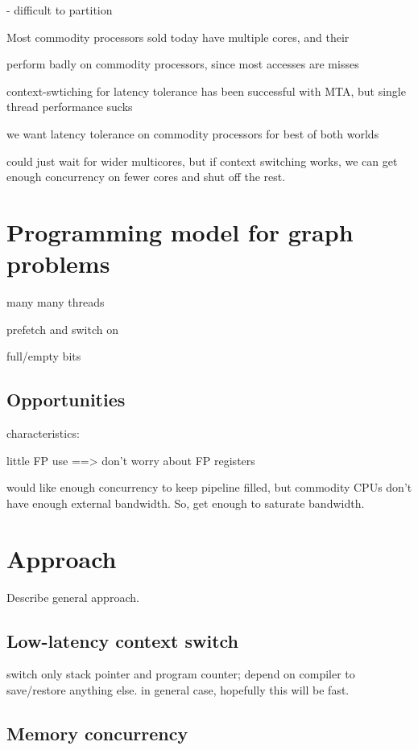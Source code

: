 \documentclass{acm_proc_article-sp}
\begin{document}
- difficult to partition




Most commodity processors sold today have multiple cores, and their 


perform badly on commodity processors, since most accesses are misses

context-swtiching for latency tolerance has been successful with MTA, but single thread performance sucks

we want latency tolerance on commodity processors for best of both worlds

could just wait for wider multicores, but if context switching works, we can get enough concurrency on fewer cores and shut off the rest.

\section{Programming model for graph problems}

many many threads

prefetch and switch on 

full/empty bits 

\subsection{Opportunities}

characteristics:



little FP use ==> don't worry about FP registers

would like enough concurrency to keep pipeline filled, but commodity CPUs don't have enough external bandwidth. So, get enough to saturate bandwidth.



\section{Approach}

Describe general approach.

\subsection{Low-latency context switch}

switch only stack pointer and program counter; depend on compiler to save/restore anything else. in general case, hopefully this will be fast.

\subsection{Memory concurrency}
\end{document}
